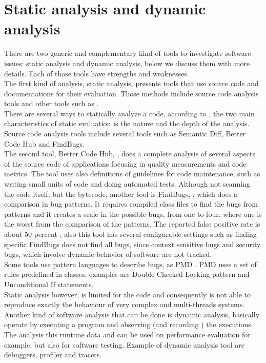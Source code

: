 \section{Static analysis and dynamic analysis}
There are two generic and complementary kind of tools to investigate software issues: static analysis and dynamic analysis, below we discuss them with more details. Each of those tools have strengths and weaknesses.\\
The first kind of analysis, static analysis, presents tools that use source code and documentations for their evaluation. Those methods include source code analysis tools \cite{source_code_analysis} and other tools such as \cite{better_code_hub}\cite{Jackson1994SDT645543655704}.\\
There are several ways to statically analyze a code, according to \cite{ind_perspective}, the two main characteristics of static evaluation is the nature and the depth of the analysis. Source code analysis tools include several tools such as Semantic Diff, Better Code Hub and FindBugs. \\
The second tool, Better Code Hub, \cite{better_code_hub}, does a complete analysis of several aspects of the source code of applications focusing in quality measurements and code metrics. The tool uses also definitions of guidelines for code maintenance, such as writing small units of code and doing automated tests.
Although not scanning the code itself, but the bytecode, another tool is FindBugs, \cite{find_bugs}, which does a comparison in bug patterns. It requires compiled class files to find the bugs from patterns and it creates a scale in the possible bugs, from one to four, where one is the worst from the comparison of the patterns. The reported false positive rate is about 50 percent \cite{find_rate}, also this tool has several configurable settings such as finding specific FindBugs does not find all bugs, since context sensitive bugs and security bugs, which involve dynamic behavior of software are not tracked.  \\
Some tools use pattern languages to describe bugs, as PMD \cite{pmd_tool}. PMD uses a set of rules predefined in classes, examples are Double Checked Locking pattern and Unconditional If statements. \\
Static analysis however, is limited for the code and consequently is not able to reproduce exactly the behaviour of very complex and multi-threads systems. 
Another kind of software analysis that can be done is dynamic analysis, basically operate by executing a program and observing (and recording ) the executions. The analysis this runtime data and can be used on performance evaluation for example, but also for software testing. Example of dynamic analysis tool are debuggers, profiler and tracers.\\

